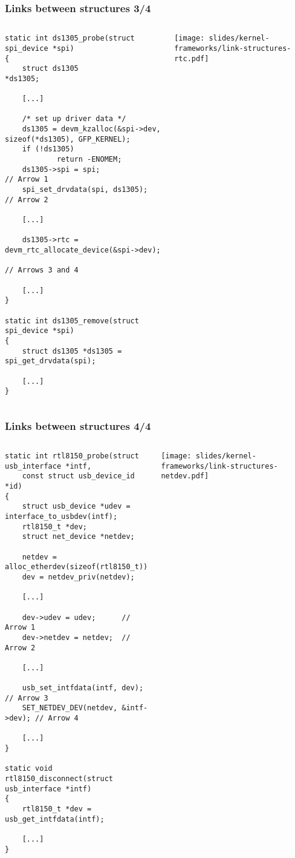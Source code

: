 \begin{frame}[fragile]
  \frametitle{Links between structures 3/4}
  \begin{columns}
    \begin{verbatim}
static int ds1305_probe(struct spi_device *spi)
{
    struct ds1305                   *ds1305;

    [...]

    /* set up driver data */
    ds1305 = devm_kzalloc(&spi->dev, sizeof(*ds1305), GFP_KERNEL);
    if (!ds1305)
            return -ENOMEM;
    ds1305->spi = spi;                         // Arrow 1
    spi_set_drvdata(spi, ds1305);              // Arrow 2

    [...]

    ds1305->rtc = devm_rtc_allocate_device(&spi->dev); 
                                               // Arrows 3 and 4

    [...]
}

static int ds1305_remove(struct spi_device *spi)
{
    struct ds1305 *ds1305 = spi_get_drvdata(spi);

    [...]
}
    \end{verbatim}
    \begin{center}
      \texttt{[image: slides/kernel-frameworks/link-structures-rtc.pdf]}
    \end{center}
  \end{columns}
\end{frame}

\begin{frame}[fragile]
  \frametitle{Links between structures 4/4}
  \begin{columns}
    \begin{verbatim}
static int rtl8150_probe(struct usb_interface *intf,
    const struct usb_device_id *id)
{
    struct usb_device *udev = interface_to_usbdev(intf);
    rtl8150_t *dev;
    struct net_device *netdev;

    netdev = alloc_etherdev(sizeof(rtl8150_t));
    dev = netdev_priv(netdev);

    [...]

    dev->udev = udev;      // Arrow 1
    dev->netdev = netdev;  // Arrow 2

    [...]

    usb_set_intfdata(intf, dev);        // Arrow 3
    SET_NETDEV_DEV(netdev, &intf->dev); // Arrow 4

    [...]
}

static void rtl8150_disconnect(struct usb_interface *intf)
{
    rtl8150_t *dev = usb_get_intfdata(intf);

    [...]
}
    \end{verbatim}
    \begin{center}
      \texttt{[image: slides/kernel-frameworks/link-structures-netdev.pdf]}
    \end{center}
  \end{columns}
\end{frame}

